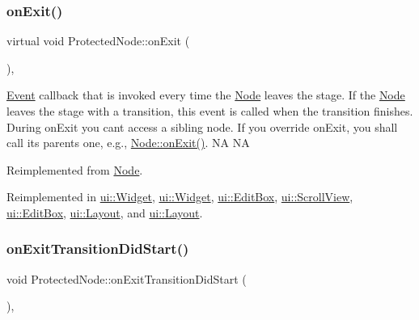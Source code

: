 \subsubsection{\texorpdfstring{on\+Exit()}{onExit()}\hspace{0.1cm}{\footnotesize\ttfamily [2/2]}}
{\footnotesize\ttfamily virtual void Protected\+Node\+::on\+Exit (\begin{DoxyParamCaption}{ }\end{DoxyParamCaption})\hspace{0.3cm}{\ttfamily [override]}, {\ttfamily [virtual]}}

\hyperlink{classEvent}{Event} callback that is invoked every time the \hyperlink{classNode}{Node} leaves the \textquotesingle{}stage\textquotesingle{}. If the \hyperlink{classNode}{Node} leaves the \textquotesingle{}stage\textquotesingle{} with a transition, this event is called when the transition finishes. During on\+Exit you can\textquotesingle{}t access a sibling node. If you override on\+Exit, you shall call its parent\textquotesingle{}s one, e.\+g., \hyperlink{classNode_ac83de835ea315e3179d4293acd8903ac}{Node\+::on\+Exit()}.  NA  NA 

Reimplemented from \hyperlink{classNode_ac83de835ea315e3179d4293acd8903ac}{Node}.



Reimplemented in \hyperlink{classui_1_1Widget_a541dd9c8492eeb30a2e50b97cc94bd6e}{ui\+::\+Widget}, \hyperlink{classui_1_1Widget_a91cbac90873d76b6edb0e41eed5477eb}{ui\+::\+Widget}, \hyperlink{classui_1_1EditBox_a4c5c9db7c8b7711a719aec6a0842696b}{ui\+::\+Edit\+Box}, \hyperlink{classui_1_1ScrollView_a9c9bf9f6d171a618d57c369e53d91a25}{ui\+::\+Scroll\+View}, \hyperlink{classui_1_1EditBox_a4151e7abfe84c879cc89f683c4975285}{ui\+::\+Edit\+Box}, \hyperlink{classui_1_1Layout_ad6be3b3eb4ca53dcbd3eb1ca966299ff}{ui\+::\+Layout}, and \hyperlink{classui_1_1Layout_a6444f3e3f124723e75f80b3d36408e34}{ui\+::\+Layout}.

\mbox{\label{classProtectedNode_a3f4bf0c9b9ec81b486f479d30fc1ed67}} 
\subsubsection{\texorpdfstring{on\+Exit\+Transition\+Did\+Start()}{onExitTransitionDidStart()}\hspace{0.1cm}{\footnotesize\ttfamily [1/2]}}
{\footnotesize\ttfamily void Protected\+Node\+::on\+Exit\+Transition\+Did\+Start (\begin{DoxyParamCaption}{ }\end{DoxyParamCaption})\hspace{0.3cm}{\ttfamily [override]}, {\ttfamily [virtual]}}

